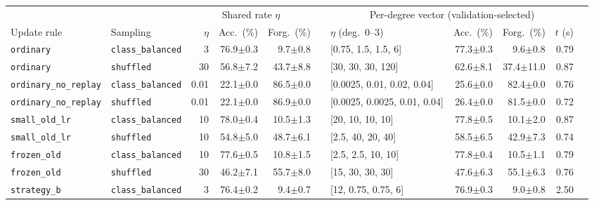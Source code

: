\begin{tabular}{@{}llrrrrlrrrr@{}}
\toprule
 & & \multicolumn{3}{c}{Shared rate $\eta$} & & \multicolumn{4}{c}{Per-degree vector (validation-selected)} & \\
\cmidrule(lr){3-5}\cmidrule(lr){7-10}
Update rule & Sampling & $\eta$ & Acc.\ (\%) & Forg.\ (\%) & & $\eta$ (deg.\ 0--3) & Acc.\ (\%) & Forg.\ (\%) & $t$ (s) \\
\midrule
\texttt{ordinary} & \texttt{class\_balanced} & 3 & 76.9{\scriptsize$\pm$0.3} & 9.7{\scriptsize$\pm$0.8} & & [0.75, 1.5, 1.5, 6] & 77.3{\scriptsize$\pm$0.3} & 9.6{\scriptsize$\pm$0.8} & 0.79 \\
\texttt{ordinary} & \texttt{shuffled} & 30 & 56.8{\scriptsize$\pm$7.2} & 43.7{\scriptsize$\pm$8.8} & & [30, 30, 30, 120] & 62.6{\scriptsize$\pm$8.1} & 37.4{\scriptsize$\pm$11.0} & 0.87 \\
\addlinespace[2pt]
\texttt{ordinary\_no\_replay} & \texttt{class\_balanced} & 0.01 & 22.1{\scriptsize$\pm$0.0} & 86.5{\scriptsize$\pm$0.0} & & [0.0025, 0.01, 0.02, 0.04] & 25.6{\scriptsize$\pm$0.0} & 82.4{\scriptsize$\pm$0.0} & 0.76 \\
\texttt{ordinary\_no\_replay} & \texttt{shuffled} & 0.01 & 22.1{\scriptsize$\pm$0.0} & 86.9{\scriptsize$\pm$0.0} & & [0.0025, 0.0025, 0.01, 0.04] & 26.4{\scriptsize$\pm$0.0} & 81.5{\scriptsize$\pm$0.0} & 0.72 \\
\addlinespace[2pt]
\texttt{small\_old\_lr} & \texttt{class\_balanced} & 10 & 78.0{\scriptsize$\pm$0.4} & 10.5{\scriptsize$\pm$1.3} & & [20, 10, 10, 10] & 77.8{\scriptsize$\pm$0.5} & 10.1{\scriptsize$\pm$2.0} & 0.87 \\
\texttt{small\_old\_lr} & \texttt{shuffled} & 10 & 54.8{\scriptsize$\pm$5.0} & 48.7{\scriptsize$\pm$6.1} & & [2.5, 40, 20, 40] & 58.5{\scriptsize$\pm$6.5} & 42.9{\scriptsize$\pm$7.3} & 0.74 \\
\addlinespace[2pt]
\texttt{frozen\_old} & \texttt{class\_balanced} & 10 & 77.6{\scriptsize$\pm$0.5} & 10.8{\scriptsize$\pm$1.5} & & [2.5, 2.5, 10, 10] & 77.8{\scriptsize$\pm$0.4} & 10.5{\scriptsize$\pm$1.1} & 0.79 \\
\texttt{frozen\_old} & \texttt{shuffled} & 30 & 46.2{\scriptsize$\pm$7.1} & 55.7{\scriptsize$\pm$8.0} & & [15, 30, 30, 30] & 47.6{\scriptsize$\pm$6.3} & 55.1{\scriptsize$\pm$6.3} & 0.76 \\
\addlinespace[2pt]
\texttt{strategy\_b} & \texttt{class\_balanced} & 3 & 76.4{\scriptsize$\pm$0.2} & 9.4{\scriptsize$\pm$0.7} & & [12, 0.75, 0.75, 6] & 76.9{\scriptsize$\pm$0.3} & 9.0{\scriptsize$\pm$0.8} & 2.50 \\

\end{tabular}
